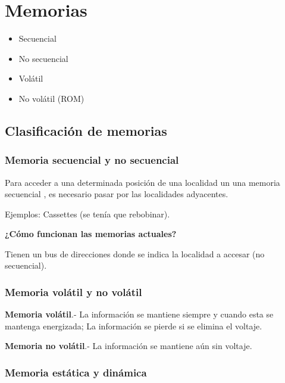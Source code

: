 \documentclass{article}
\begin{document}
\newpage

\section{Memorias}

\begin{itemize}
	\item
		Secuencial
	\item
		No secuencial
	\item
		Volátil
	\item
		No volátil (ROM)
\end{itemize}

\subsection{Clasificación de memorias}

\subsubsection{Memoria secuencial y no secuencial}

Para acceder a una determinada posición de una localidad un una memoria secuencial
, es necesario pasar por las localidades adyacentes.

\vspace{1em}
Ejemplos: Cassettes (se tenía que rebobinar).

\vspace{1em}
\textbf{¿Cómo funcionan las memorias actuales?}

\vspace{1em}
Tienen un bus de direcciones donde se indica la localidad a accesar (no secuencial).

\subsubsection{Memoria volátil y no volátil}

\textbf{Memoria volátil}.- La información se mantiene siempre y cuando esta se
mantenga energizada; La información se pierde si se elimina el voltaje.

\vspace{1em}
\textbf{Memoria no volátil}.- La información se mantiene aún sin voltaje.

\subsubsection{Memoria estática y dinámica}
\end{document}
